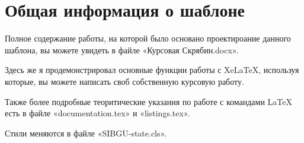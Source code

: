 \documentclass{../SIBGU-state}
\begin{document}
\section{Общая информация о шаблоне}

Полное содержание работы, на которой было основано проектироание данного шаблона, вы можете увидеть в файле «Курсовая Скрябин.docx». \par
Здесь же я продемонстрировал основные функции работы с XeLaTeX, используя которые, вы можете написать своб собственную курсовую работу. \par
Также более подробные теоритические указания по работе с командами LaTeX есть в файле «documentation.tex» и «listings.tex». \par
Стили меняются в файле «SIBGU-state.cls». \par


	
\end{document}
